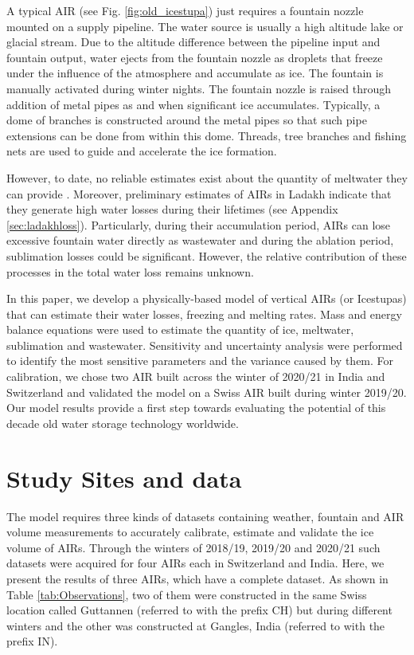 \documentclass[utf8]{frontiersSCNS}
\begin{document}
A typical AIR (see Fig. \ref{fig:old_icestupa}) just requires a fountain nozzle mounted on a supply pipeline.
The water source is usually a high altitude lake or glacial stream. Due to the altitude difference between the
pipeline input and fountain output, water ejects from the fountain nozzle as droplets that freeze under the
influence of the atmosphere and accumulate as ice. The fountain is manually activated during winter nights. The fountain nozzle is
raised through addition of metal pipes as and when significant ice accumulates.  Typically, a dome of branches
is constructed around the metal pipes so that such pipe extensions can be done from within this dome.  Threads,
tree branches and fishing nets are used to guide and accelerate the ice formation.

However, to date, no reliable estimates exist about the quantity of meltwater they can provide
\citep{Nusser_2018} . Moreover, preliminary estimates of AIRs in Ladakh indicate that they generate high water
losses during their lifetimes (see Appendix \ref{sec:ladakhloss}). Particularly, during their accumulation
period, AIRs can lose excessive fountain water directly as wastewater and during the ablation period, sublimation
losses could be significant.  However, the relative contribution of these processes in the total water loss
remains unknown.

In this paper, we develop a physically-based model of vertical AIRs (or Icestupas) that can estimate their water
losses, freezing and melting rates. Mass and energy balance equations were used to estimate the quantity of
ice, meltwater, sublimation and wastewater. Sensitivity and uncertainty analysis were performed to identify the
most sensitive parameters and the variance caused by them. For calibration, we chose two AIR built across the
winter of 2020/21 in India and Switzerland and validated the model on a Swiss AIR built during winter 2019/20.
Our model results provide a first step towards evaluating the potential of this decade old water storage
technology worldwide.

\section{Study Sites and data}

The model requires three kinds of datasets containing weather, fountain and AIR volume measurements to
accurately calibrate, estimate and validate the ice volume of AIRs. Through the winters of 2018/19, 2019/20 and
2020/21 such datasets were acquired for four AIRs each in Switzerland and India. Here, we present the results of
three AIRs, which have a complete dataset. As shown in Table \ref{tab:Observations}, two of them were
constructed in the same Swiss location called Guttannen (referred to with the prefix CH) but during different
winters and the other was constructed at Gangles, India (referred to with the prefix IN).
\end{document}
